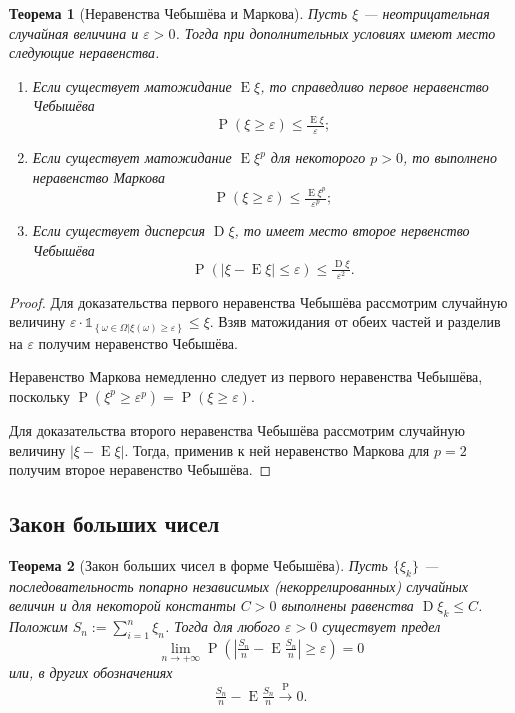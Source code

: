 \documentclass[12pt]{article}
\newtheorem{theorem}{Теорема}
\numberwithin{theorem}{section}
\theoremstyle{definition}
\newcommand{\prob}{\operatorname{P}}
\newcommand{\expect}{\operatorname{E}}
\newcommand{\disp}{\operatorname{D}}
\newcommand{\ind}{\mathds{1}}
\newcommand{\defineset}[2]{\left\{
	\left.
	#1
	\right\vert
	#2
	\right\}}
\begin{document}
	\begin{theorem}[Неравенства Чебышёва и Маркова] \label{inequalities}
		Пусть $ \xi $ --- неотрицательная случайная величина и $ \varepsilon > 0 $.
		Тогда при дополнительных условиях имеют место следующие неравенства.
		\begin{enumerate}
			\item Если существует матожидание $ \expect\xi $, 
			то справедливо первое неравенство Чебышёва 
			$$ \prob(\xi \geqslant \varepsilon) \leqslant \tfrac{\expect\xi}{\varepsilon}; $$
			\label{inequalities | Chebyshev 1}
			\item Если существует матожидание $ \expect\xi^p $ для некоторого $ p > 0 $,
			то выполнено неравенство Маркова
			$$ \prob(\xi \geqslant \varepsilon) \leqslant \tfrac{\expect\xi^p}{\varepsilon^p}; $$
			\label{inequalities | Markov}
			\item Если существует дисперсия $ \disp\xi $, то имеет место второе нервенство Чебышёва
			$$ \prob(|\xi - \expect\xi| \leqslant \varepsilon) \leqslant \tfrac{\disp\xi}{\varepsilon^2}. $$
			\label{inequalities | Chebyshev 2}
		\end{enumerate}
	\end{theorem}
	
	\begin{proof}
		Для доказательства первого неравенства Чебышёва рассмотрим случайную величину 
		$ \varepsilon\cdot\ind_{\defineset{\omega \in \Omega}{\xi(\omega) \geqslant \varepsilon}} \leqslant \xi $.
		Взяв матожидания от обеих частей и разделив на $ \varepsilon $ получим неравенство Чебышёва.
		
		Неравенство Маркова немедленно следует из первого неравенства Чебышёва,
		поскольку $ \prob(\xi^p \geqslant \varepsilon^p) = \prob(\xi \geqslant \varepsilon) $.
		
		Для доказательства второго неравенства Чебышёва рассмотрим случайную величину $ |\xi - \expect\xi| $.
		Тогда, применив к ней неравенство Маркова для $ p = 2 $ получим второе неравенство Чебышёва.
	\end{proof}
	
	\subsection{Закон больших чисел}
	
	\begin{theorem}[Закон больших чисел в форме Чебышёва] \label{large numbes law | Chebishov}
		Пусть $ \{\xi_k\} $ --- последовательность попарно независимых (некоррелированных)
		случайных величин и для некоторой константы $ C > 0 $ выполнены равенства
		$ \disp\xi_k \leqslant C $. Положим $ S_n := \sum\limits_{i = 1}^{n} \xi_n $.
		Тогда для любого $ \varepsilon > 0 $ существует предел
		$$ \lim\limits_{n \to +\infty} \prob(|\tfrac{S_n}{n} - \expect\tfrac{S_n}{n}| \geqslant \varepsilon) = 0 $$ 
		или, в других обозначениях 
		$$ \tfrac{S_n}{n} - \expect\tfrac{S_n}{n} \overset{\prob}{\to} 0. $$
	\end{theorem}
	
\end{document}
